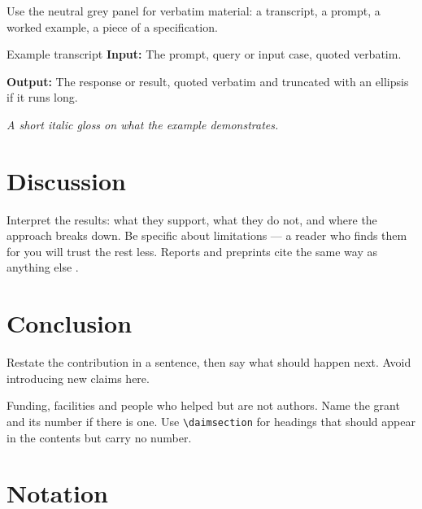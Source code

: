 \documentclass{daimreport}
\begin{document}
Use the neutral grey panel for verbatim material: a transcript, a prompt, a
worked example, a piece of a specification.

\begin{daimbox}[breakable=false]{Example transcript}
\textbf{Input:} The prompt, query or input case, quoted verbatim.

\textbf{Output:} The response or result, quoted verbatim and truncated with an
ellipsis if it runs long.

\textit{A short italic gloss on what the example demonstrates.}
\end{daimbox}

\section{Discussion}

Interpret the results: what they support, what they do not, and where the
approach breaks down. Be specific about limitations --- a reader who finds them
for you will trust the rest less. Reports and preprints cite the same way as
anything else \citep{placeholder-report}.

\section{Conclusion}

Restate the contribution in a sentence, then say what should happen next. Avoid
introducing new claims here.


Funding, facilities and people who helped but are not authors. Name the grant
and its number if there is one. Use \verb|\daimsection| for headings that
should appear in the contents but carry no number.


\daimappendix

\section{Notation}
\end{document}
